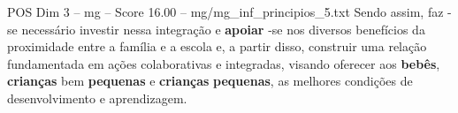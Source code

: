 \begin{textsample}{POS Dim 3 – mg – Score 16.00 – mg/mg\_inf\_principios\_5.txt}
Sendo assim, faz -se necessário investir nessa integração e \textbf{apoiar} -se nos diversos benefícios da proximidade entre a família e a escola e, a partir disso, construir uma relação fundamentada em ações colaborativas e integradas, visando oferecer aos \textbf{bebês}, \textbf{crianças} bem \textbf{pequenas} e \textbf{crianças} \textbf{pequenas}, as melhores condições de desenvolvimento e aprendizagem.

\end{textsample}
